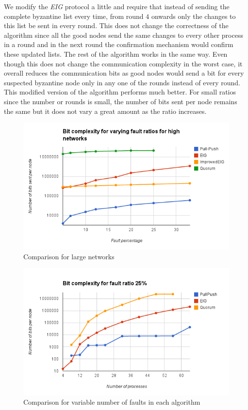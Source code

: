 We modify the \textit{EIG} protocol a little and require that instead of sending the complete byzantine list every time, from round $4$ onwards only the changes to this list be sent in every round. This does not change the correctness of the algorithm since all the good nodes send the same changes to every other process in a round and in the next round the confirmation mechanism would confirm these updated lists. The rest of the algorithm works in the same way. Even though this does not change the communication complexity in the worst case, it overall reduces the communication bits as good nodes would send a bit for every suspected byzantine node only in any one of the rounds instead of every round. This modified version of the algorithm performs much better. For small ratios since the number or rounds is small, the number of bits sent per node remains the same but it does not vary a great amount as the ratio increases.
\begin{figure}[ht]
 \centering
\includegraphics[scale=0.4]{LargeNetBit}
\caption{Comparison for large networks}
 \label{fig:comp}
\end{figure}

\begin{figure}[ht]
 \centering
\includegraphics[scale=0.4]{Fault25}
\caption{ Comparison for variable number of faults in each algorithm}
 \label{fig:fault25}
\end{figure}

